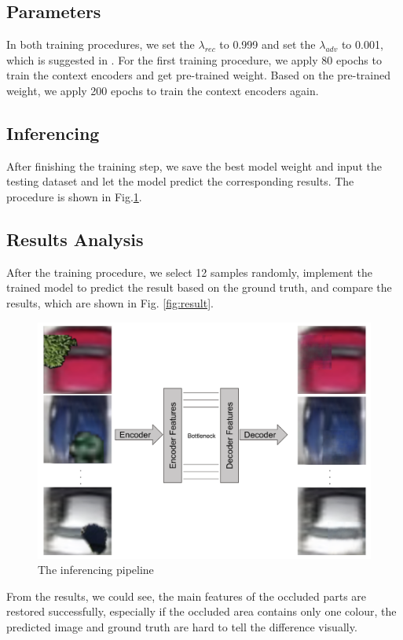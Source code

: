 \subsection{Parameters}
In both training procedures, we set the $\lambda_{rec}$ to 0.999 and set the $\lambda_{adv}$ to 0.001, which is suggested in \cite{urldcgan}. For the first training procedure, we apply 80 epochs to train the context encoders and get pre-trained weight. Based on the pre-trained weight, we apply 200 epochs to train the context encoders again.

\subsection{Inferencing}
After finishing the training step, we save the best model weight and input the testing dataset and let the model predict the corresponding results. The procedure is shown in Fig.\ref{fig:inferencing}.
\subsection{Results Analysis}

After the training procedure, we select 12 samples randomly, implement the trained model to predict the result based on the ground truth, and compare the results, which are shown in Fig. \ref{fig:result}.
    \begin{figure}[hbt]
    	\centering
    	\includegraphics[width=0.9\linewidth]{contents/Inferencing.png}
    	\caption{The inferencing pipeline}
        \label{fig:inferencing}
    \end{figure}
    



From the results, we could see, the main features of the occluded parts are restored successfully, especially if the occluded area contains only one colour, the predicted image and ground truth are hard to tell the difference visually. 

